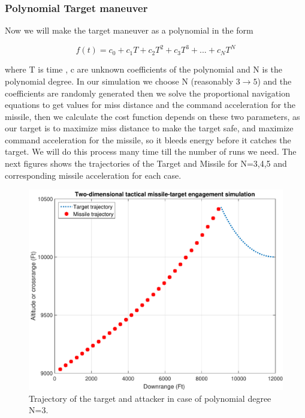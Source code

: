 \subsubsection{Polynomial Target maneuver}
Now we will make the target maneuver as a polynomial in the form

\begin{equation}
	f(t) = c_0 + c_1 T + c_2 T^2 + c_3 T^3 + ... + c_N T^N
\end{equation} 

where T is time , c are unknown coefficients of the polynomial and N is the polynomial degree.
In our simulation we choose N (reasonably $3\to5$) and the coefficients are randomly generated then we solve the proportional navigation equations to get values for miss distance and the command acceleration for the missile, then we calculate the cost function depends on these two parameters, as our target is to maximize miss distance to make the target safe, and maximize command acceleration for the missile, so it bleeds energy before it catches the target. We will do this process many time till the number of runs we need. The next figures shows the trajectories of the Target and Missile for N=3,4,5 and corresponding missile acceleration for each case.

\begin{figure}[htb]
	\centering
	\includegraphics[scale = 0.75]{fig/trajectoryP3.pdf}
	\caption{Trajectory of the target and attacker in case of polynomial degree N=3.}
	\label{trajectoryP3}
\end{figure}


